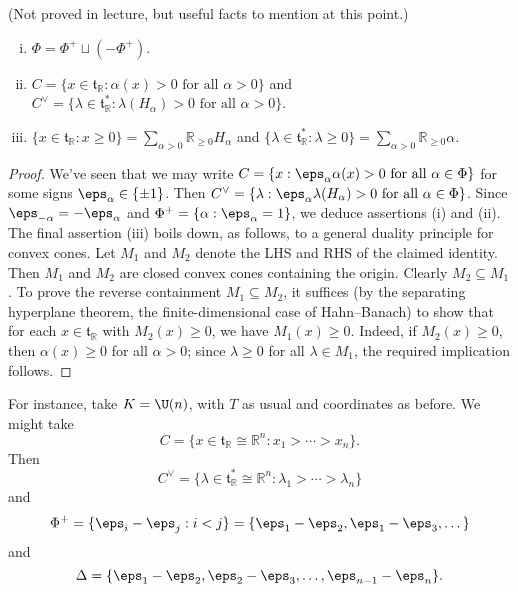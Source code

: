 \documentclass[reqno]{amsart} 
\begin{document}
\begin{lemma}
  (Not proved in lecture, but useful facts to mention at this point.)
  \begin{enumerate}
[(i)]
  \item $\Phi = \Phi^+ \sqcup (-\Phi^+)$.
  \item $C = \{x \in \mathfrak{t}_{\mathbb{R}} : \alpha(x) > 0 \text{ for all } \alpha > 0\}$ and $C^\vee = \{\lambda \in \mathfrak{t}_{\mathbb{R}}^* : \lambda(H_\alpha) > 0 \text{ for all } \alpha > 0\}$.
  \item $\{ x \in \mathfrak{t}_{\mathbb{R}} : x \geq 0 \} = \sum_{\alpha > 0} \mathbb{R}_{\geq 0} H_{\alpha}$ and $\{ \lambda \in \mathfrak{t}_{\mathbb{R}}^* : \lambda \geq 0 \} = \sum_{\alpha > 0} \mathbb{R}_{\geq 0} \alpha$.
  \end{enumerate}
\end{lemma}
\begin{proof}
  We've seen that we may write $C = \{x : \eps_\alpha \alpha(x) > 0 \text{ for all } \alpha \in \Phi \}$ for some signs $\eps_\alpha \in \{\pm 1\}$.  Then $C^\vee = \{\lambda : \eps_\alpha \lambda(H_\alpha) > 0 \text{ for all } \alpha \in \Phi \}$.  Since $\eps_{-\alpha} = - \eps_{\alpha}$ and $\Phi^+ = \{\alpha : \eps_\alpha = 1\}$, we deduce assertions (i) and (ii).  The final assertion (iii) boils down, as follows, to a general duality principle for convex cones.  Let $M_1$ and $M_2$ denote the LHS and RHS of the claimed identity.  Then $M_1$ and $M_2$ are closed convex cones containing the origin.  Clearly $M_2 \subseteq M_1$.  To prove the reverse containment $M_1 \subseteq M_2$, it suffices (by the separating hyperplane theorem, the finite-dimensional case of Hahn--Banach) to show that for each $x \in \mathfrak{t}_{\mathbb{R}}$ with $M_2(x) \geq 0$, we have $M_1(x) \geq 0$.  Indeed, if $M_2(x) \geq 0$, then $\alpha(x) \geq 0$ for all $\alpha > 0$; since $\lambda \geq 0$ for all $\lambda \in M_1$, the required implication follows.
\end{proof}


For instance, take $K = \U(n)$, with $T$ as usual and coordinates as before.  We might take
\begin{equation}
  C = \{x \in \mathfrak{t}_{\mathbb{R}} \cong \mathbb{R}^n : x_1
  > \dotsb > x_n\}.
\end{equation}
Then
\begin{equation*}
  C^\vee = \{\lambda \in \mathfrak{t}_{\mathbb{R}}^* \cong
  \mathbb{R}^n:
  \lambda_1 > \dotsb > \lambda_n\}
\end{equation*}
and
\begin{equation}
  \Phi^+ = \{\eps_i - \eps_j : i < j\} = \{\eps_1 - \eps_2,
  \eps_1 - \eps_3, \dotsc\}
\end{equation}
and
\begin{equation*}
  \Delta = \{\eps_1 - \eps_2, \eps_2 - \eps_3, \dotsc, \eps_{n-1} - \eps_n\}.
\end{equation*}
\end{document}
